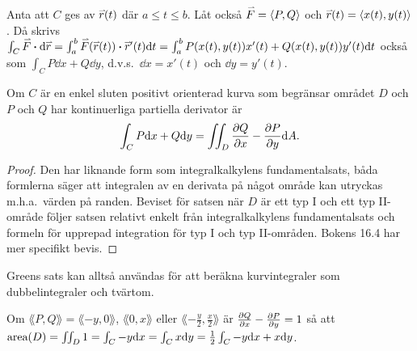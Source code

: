 \documentclass[a4paper]{article}
\begin{document}
\begin{defn}[Notation]
    Anta att \(
        C
    \) ges av \(
        \accentset{\rightharpoonup}{r}(t)
    \) där \(
        a \leq t \leq b
    \). Låt också \(
        \accentset{\rightharpoonup}{F} = \left\langle P, Q\right\rangle
    \) och \(
        \accentset{\rightharpoonup}{r}(t) = \left\langle x(t), y(t) \right\rangle
    \). Då skrivs \(
        \int_C \accentset{\rightharpoonup}{F} \boldsymbol{\cdot} \dd \accentset{\rightharpoonup}{r} = \int_a^b \accentset{\rightharpoonup}{F}(\accentset{\rightharpoonup}{r}(t)) \boldsymbol{\cdot} \accentset{\rightharpoonup}{r}'(t) \dd t
            = \int_a^b P(x(t), y(t)) x'(t) + Q(x(t), y(t))y'(t) \dd t
    \) också som \(
        \int_C P \dd x + Q \dd y
    \), d.v.s.\ \(
        \dd x = x'(t)
    \) och \(
        \dd y = y'(t)
    \).
\end{defn}

\begin{sats}
    Om \(
        C
    \) är en enkel sluten positivt orienterad kurva som begränsar området \(
        D
    \) och \(
        P
    \) och \(
        Q
    \) har kontinuerliga partiella derivator är \[
        \int_C P \dd x +  Q \dd y = \iint_D \pdv{Q}{x} - \pdv{P}{y} \dd A.
    \] 

    \begin{proof}
        Den har liknande form som integralkalkylens fundamentalsats, båda formlerna
        säger att integralen av en derivata på något område kan utryckas m.h.a.\ 
        värden på randen. Beviset för satsen när \(
            D
        \) är ett typ I och ett typ II-område följer satsen relativt enkelt från 
        integralkalkylens fundamentalsats och formeln för upprepad integration
        för typ I och typ II-områden. Bokens 16.4 har mer specifikt bevis. 
    \end{proof}
\end{sats}

Greens sats kan alltså användas för att beräkna kurvintegraler som dubbelintegraler 
och tvärtom. 

\begin{sats}
    Om \(
        \lang P, Q\rang = \lang -y, 0\rang
    \), \(
        \lang 0, x\rang
    \) eller \(
        \lang -\frac{y}{2} , \frac{x}{2}\rang 
    \) är \(
        \pdv{Q}{x} - \pdv{P}{y} = 1
    \) så att \(
        \text{area}(D) = \iint_D 1 = \int_C -y \dd x = \int_C x \dd y = \frac{1}{2} \int_C -y \dd x + x \dd y 
    \).
\end{sats}
\end{document}
